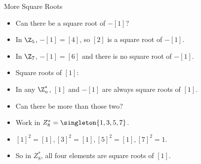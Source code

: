 \documentclass[handout]{beamer}
\begin{document}
\begin{frame}{More Square Roots}

\begin{itemize}
  \item Can there be a square root of $-[1]$?
  \item In $\Z_5$, $-[1] = [4]$, so $[2]$ is a square root of $-[1]$.
  \item In $\Z_7$, $-[1] = [6]$ and there is no square root of $-[1]$.
  \item Square roots of $[1]$:
  \item In any $\Z_n^*$, $[1]$ and $-[1]$ are always square roots of $[1]$.
  \item Can there be more than those two?
  \item Work in $Z_8^* = \singleton{1,3,5,7}$.
  \item $[1]^2=[1],[3]^2=[1],[5]^2=[1],[7]^2=1$.
  \item So in $Z_8^*$, all four elements are square roots of $[1]$.
\end{itemize}

\end{frame}
\end{document}
